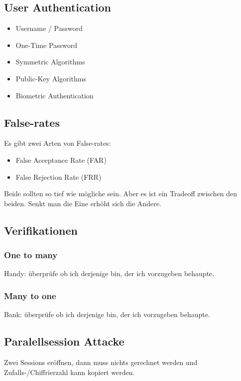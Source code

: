 \documentclass[12pt]{scrartcl}
\begin{document}
\subsection{User Authentication}

\begin{itemize}
    \item Username / Password
    \item One-Time Password
    \item Symmetric Algorithms
    \item Public-Key Algorithms
    \item Biometric Authentication
\end{itemize}

\vspace{0.5cm}
\subsection{False-rates}
Es gibt zwei Arten von False-rates:
\begin{itemize}
    \item False Acceptance Rate (FAR)
    \item False Rejection Rate (FRR)
\end{itemize}

Beide sollten so tief wie mögliche sein. Aber es ist ein Tradeoff zwischen den beiden.
Senkt man die Eine erhöht sich die Andere.


\subsection{Verifikationen}
\subsubsection{One to many}
Handy: überprüfe ob ich derjenige bin, der ich vorzugeben behaupte.


\subsubsection{Many to one}
Bank: überprüfe ob ich derjenige bin, der ich vorzugeben behaupte.


\newpage
\subsection{Paralellsession Attacke}
Zwei Sessions eröffnen, dann muss nichts gerechnet werden und Zufalls-/Chiffrierzahl
kann kopiert werden.
\end{document}
